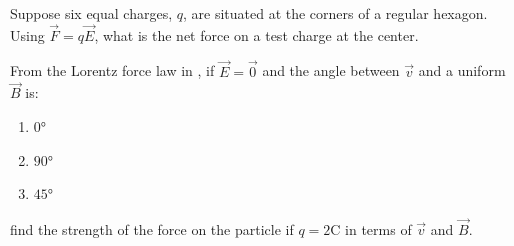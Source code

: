 \begin{problem}[1]
  Suppose six equal charges, \(q\), are situated at the corners of a regular hexagon. Using \(\vec{F}=q\vec{E}\), what is the net force on a test charge at the center.
\end{problem}
\begin{problem}[1]
  From the Lorentz force law in , if \(\vec{E}=\vec{0}\) and the angle between \(\vec{v}\) and a uniform \(\vec{B}\) is:
  \begin{enumerate}[label=\alph*)]
    \item{\(\ang{0}\)}
    \item{\(\ang{90}\)}
    \item{\(\ang{45}\)}
  \end{enumerate}


  find the strength of the force on the particle if \(q=2\si{\coulomb}\) in terms of \(\vec{v}\) and \(\vec{B}\).
\end{problem}
